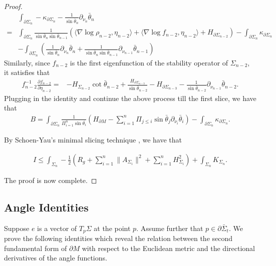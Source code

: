 \documentclass[11pt,letterpaper]{amsart}
\begin{document}
\begin{proof}
\begin{align*}
    &\int_{\partial\Sigma_n}-\kappa_{\partial\Sigma_n}-\frac{1}{\sin\bar{\theta}_n}\partial_{\nu_n}\bar{\theta}_n\\
    =&\int_{\partial\Sigma_n}\frac{1}{\sin\bar{\theta}_n\sin\bar{\theta}_{n-1}}\left(\langle \nabla \log \rho_{n-2},\eta_{n-2}\rangle+\langle \nabla \log f_{n-2},\eta_{n-2}\rangle +H_{\partial\Sigma_{n-2}}\right)-\int_{\partial\Sigma_n}\kappa_{\partial\Sigma_n}\\
    &-\int_{\partial\Sigma_{n}}\left(\frac{1}{\sin\bar{\theta}_n}\partial_{\nu_n}\bar{\theta}_n+\frac{1}{\sin\bar{\theta}_n\sin\bar{\theta}_{n-1}}\partial_{\nu_{n-1}}\bar{\theta}_{n-1}\right)
\end{align*}
Similarly, since $f_{n-2}$ is the first eigenfunction of the stability operator of $\Sigma_{n-2}$, it satisfies that
\begin{align*}
    f_{n-2}^{-1}\frac{\partial f_{n-2}}{\partial\eta_{n-2}}=&-H_{\Sigma_{n-2}}\cot\bar{\theta}_{n-2}+\frac{H_{\partial\Sigma_{n-3}}}{\sin\bar{\theta}_{n-2}}-H_{\partial\Sigma_{n-3}}-\frac{1}{\sin\bar{\theta}_{n-2}}\partial_{\nu_{n-1}}\bar{\theta}_{n-2}.
\end{align*}
Plugging in the identity and continue the above process till the first slice, we have that
\begin{align}
    B=\int_{\partial\Sigma_n}\frac{1}{\Pi_{i=1}^n\sin\bar{\theta_i}}\left(H_{\partial M}-\sum_{i=1}^n\Pi_{j\leq i}\sin\bar{\theta}_j\partial_{\nu_i}\bar{\theta}_i\right)-\int_{\partial\Sigma_n}\kappa_{\partial\Sigma_n}.
\end{align}

By Schoen-Yau's minimal slicing technique \cite{schoen2017positive}, we have that

\begin{align*}
    I\leq \int_{\Sigma_n}-\frac{1}{2}\left(R_g+\sum_{i=1}^n\|A_{\Sigma_i}\|^2+\sum_{i=1}^nH_{\Sigma_i}^2\right)+\int_{\Sigma_n}K_{\Sigma_n}.
\end{align*}

The proof is now complete.
\end{proof}
\subsection{Angle Identities}
Suppose $e$ is a vector of $T_p\Sigma$ at the point $p$. Assume further that $p\in \partial\bar{\Sigma}_t$. We prove the following identities which reveal the relation between the second fundamental form of $\partial M$ with respect to the Euclidean metric and the directional derivatives of the angle functions.
\end{document}
